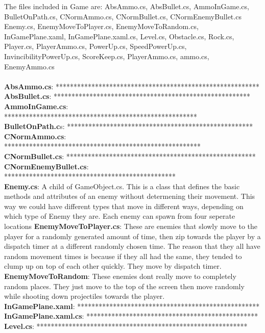 \documentclass[10pt,conference,onecolumn,compsoc]{IEEEtran}
\begin{document}
The files included in Game are: AbsAmmo.cs, AbsBullet.cs, AmmoInGame.cs, BulletOnPath.cs, CNormAmmo.cs, CNormBullet.cs, CNormEnemyBullet.cs
Enemy.cs, EnemyMoveToPlayer.cs, EnemyMoveToRandom.cs, InGamePlane.xaml, InGamePlane.xaml.cs, Level.cs, Obstacle.cs, Rock.cs,
Player.cs, PlayerAmmo.cs, PowerUp.cs, SpeedPowerUp.cs, InvincibilityPowerUp.cs, ScoreKeep.cs, PlayerAmmo.cs, ammo.cs, EnemyAmmo.cs\\\\

\textbf{AbsAmmo.cs}: *********************************************************\\
\textbf{AbsBullet.cs}: *******************************************************\\
\textbf{AmmoInGame.cs}: ******************************************************\\
\textbf{BulletOnPath.c}s: ****************************************************\\
\textbf{CNormAmmo.cs}: *******************************************************\\
\textbf{CNormBullet.cs}: *****************************************************\\
\textbf{CNormEnemyBullet.cs}: ************************************************\\
\textbf{Enemy.cs}: A child of GameObject.cs. This is a class that defines the basic methods and attributes of an enemy without determening their movement. 
This way we could have different types that move in different ways, depending on which type of Enemy they are. Each enemy can spawn from four seperate locations
\textbf{EnemyMoveToPlayer.cs}: These are enemies that slowly move to the player for a randomly generated amount of time, then zip towards the player
by a dispatch timer at a different randomly chosen time. The reason that they all have random movement times is because if they all had the same, they tended to clump up on top of each other quickly. They move by dispatch timer.\\
\textbf{EnemyMoveToRandom}: These enemies dont really move to completely random places. They just move to the top of the screen then move randomly
while shooting down projectiles towards the player.\\
\textbf{InGamePlane.xaml}: ***************************************************\\
\textbf{InGamePlane.xaml.cs}: ************************************************\\
\textbf{Level.cs}: ***********************************************************\\
\end{document}
